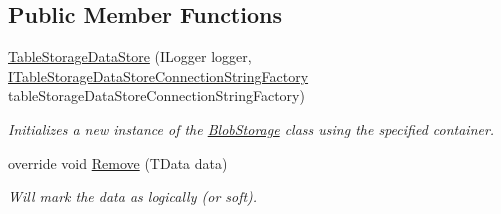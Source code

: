 \subsection*{Public Member Functions}
\begin{DoxyCompactItemize}
\item 
\hyperlink{classCqrs_1_1Azure_1_1BlobStorage_1_1DataStores_1_1TableStorageDataStore_a29c0fb07b5b5e6655a24cc831484646a_a29c0fb07b5b5e6655a24cc831484646a}{Table\+Storage\+Data\+Store} (I\+Logger logger, \hyperlink{interfaceCqrs_1_1Azure_1_1BlobStorage_1_1DataStores_1_1ITableStorageDataStoreConnectionStringFactory}{I\+Table\+Storage\+Data\+Store\+Connection\+String\+Factory} table\+Storage\+Data\+Store\+Connection\+String\+Factory)
\begin{DoxyCompactList}\small\item\em Initializes a new instance of the \hyperlink{namespaceCqrs_1_1Azure_1_1BlobStorage}{Blob\+Storage} class using the specified container. \end{DoxyCompactList}\item 
override void \hyperlink{classCqrs_1_1Azure_1_1BlobStorage_1_1DataStores_1_1TableStorageDataStore_a724d1188cdac6a7bfe7c753480f0c09a_a724d1188cdac6a7bfe7c753480f0c09a}{Remove} (T\+Data data)
\begin{DoxyCompactList}\small\item\em Will mark the {\itshape data}  as logically (or soft). \end{DoxyCompactList}\end{DoxyCompactItemize}
